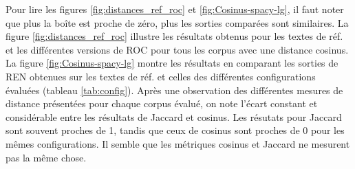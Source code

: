 Pour lire les figures \ref{fig:distances_ref_roc} et \ref{fig:Cosinus-spacy-lg}, il faut noter que plus la boîte est proche de zéro, plus les sorties comparées sont similaires. La figure \ref{fig:distances_ref_roc} illustre les résultats obtenus pour les textes de réf. et les différentes versions de ROC pour tous les corpus avec une distance cosinus. La figure \ref{fig:Cosinus-spacy-lg} montre les résultats en comparant les sorties de REN obtenues sur les textes de réf. et celles des différentes configurations évaluées (tableau \ref{tab:config}). 
Après une observation des différentes mesures de distance présentées pour chaque corpus évalué, on note l'écart constant et considérable entre les résultats de Jaccard et cosinus. Les résutats pour Jaccard sont souvent proches de 1, tandis que ceux de cosinus sont proches de 0 pour les mêmes configurations. Il semble que les métriques cosinus et Jaccard ne mesurent pas la même chose. 

